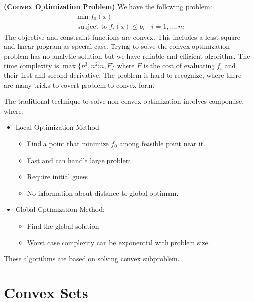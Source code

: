 \begin{definition}{\textbf{(Convex Optimization Problem)}}
    We have the following problem:
    \begin{equation*}
    \begin{aligned}
        &\min f_0(x)\\
        &\text{ subject to } f_i(x) \le b_i \quad i=1,\dots,m
    \end{aligned}
    \end{equation*}
    The objective and constraint functions are convex. This includes a least square and linear program as special case. Trying to solve the convex optimization problem has no analytic solution but we have reliable and efficient algorithm. The time complexity is $\max\{ n^3, n^2m, F \}$ where $F$ is the cost of evaluating $f_i$ and their first and second derivative. The problem is hard to recognize, where there are many tricks to covert problem to convex form.
\end{definition}

\begin{remark}
    The traditional technique to solve non-convex optimization involves compomise, where:
    \begin{itemize}
        \item Local Optimization Method
        \begin{itemize}
            \item Find a point that minimize $f_0$ among feasible point near it.
            \item Fast and can handle large problem
            \item Require initial guess 
            \item No information about distance to global optimum.
        \end{itemize}
        \item Global Optimization Method:
        \begin{itemize}
            \item Find the global solution
            \item Worst case complexity can be exponential with problem size.
        \end{itemize}
    \end{itemize}
    These algorithms are based on solving convex subproblem. 
\end{remark}

\section{Convex Sets}

